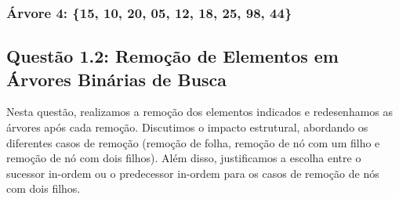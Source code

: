 \documentclass{article}
\begin{document}
\begin{center}
\begin{minipage}{0.45\textwidth}
    \subsubsection{Árvore 4: \{15, 10, 20, 05, 12, 18, 25, 98, 44\}}
  \end{minipage}
\end{center}

\subsection{Questão 1.2: Remoção de Elementos em Árvores Binárias de Busca}

Nesta questão, realizamos a remoção dos elementos indicados e redesenhamos as árvores após cada remoção. Discutimos o impacto estrutural, abordando os diferentes casos de remoção (remoção de folha, remoção de nó com um filho e remoção de nó com dois filhos). Além disso, justificamos a escolha entre o sucessor in-ordem ou o predecessor in-ordem para os casos de remoção de nós com dois filhos.
\end{document}
